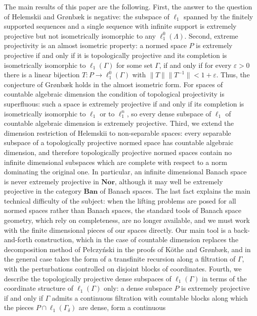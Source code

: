 \documentclass[12pt]{article}
\newcommand{\Nor}{\mathbf{Nor}}
\newcommand{\Ban}{\mathbf{Ban}}
\newcommand{\lo}[1]{\ell_1^0(#1)}
\newcommand{\ellone}[1]{\ell_1(#1)}
\newcommand{\norm}[1]{\lVert #1\rVert}
\begin{document}
The main results of this paper are the following. First, the answer to the
question of Helemskii and Gr{\o}nb{\ae}k is negative: the subspace of $\ell_1$
spanned by the finitely supported sequences and a single sequence with
infinite support is extremely projective but not isometrically isomorphic to
any $\lo{\Lambda}$. Second, extreme projectivity is an almost isometric
property: a normed space $P$ is extremely projective if and only if it is
topologically projective and its completion is isometrically isomorphic to
$\ellone{\Gamma}$ for some set $\Gamma$, if and only if for every
$\varepsilon>0$ there is a linear bijection $T:P\to\lo{\Gamma}$ with
$\norm{T}\norm{T^{-1}}<1+\varepsilon$. Thus, the conjecture of Gr{\o}nb{\ae}k
holds in the almost isometric form. For spaces of countable algebraic
dimension the condition of topological projectivity is superfluous: such a
space is extremely projective if and only if its completion is isometrically
isomorphic to $\ell_1$ or to $\ell_1^n$, so every dense subspace of $\ell_1$
of countable algebraic dimension is extremely projective. Third, we extend
the dimension restriction of Helemskii to non-separable spaces: every
separable subspace of a topologically projective normed space has countable
algebraic dimension, and therefore topologically projective normed spaces
contain no infinite dimensional subspaces which are complete with respect to
a norm dominating the original one. In particular, an infinite dimensional
Banach space is never extremely projective in $\Nor$, although it may well
be extremely projective in the category $\Ban$ of Banach spaces. The last
fact explains the main technical difficulty of the subject: when the lifting
problems are posed for all normed spaces rather than Banach spaces, the
standard tools of Banach space geometry, which rely on completeness, are no
longer available, and we must work with the finite dimensional pieces of our
spaces directly. Our main tool is a back-and-forth construction, which in the
case of countable dimension replaces the decomposition method of
Pe{\l}czy\'nski in the proofs of K\"othe and Gr{\o}nb{\ae}k, and in the
general case takes the form of a transfinite recursion along a filtration of
$\Gamma$, with the perturbations controlled on disjoint blocks of
coordinates. Fourth, we describe the topologically projective dense
subspaces of $\ellone{\Gamma}$ in terms of the coordinate structure of
$\ellone{\Gamma}$ only: a dense subspace $P$ is extremely projective if and
only if $\Gamma$ admits a continuous filtration with countable blocks along
which the pieces $P\cap\ellone{\Gamma_\delta}$ are dense, form a continuous
\end{document}
